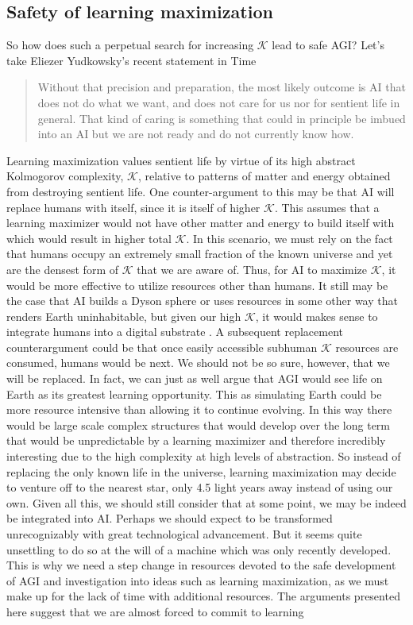 \documentclass{article}
\begin{document}
\subsection{Safety of learning maximization}
So how does such a perpetual search for increasing $\mathcal{K}$ lead to safe AGI?
Let's take Eliezer Yudkowsky's recent statement in Time \cite{yudkowsky-time}

\begin{quotation}
Without that precision and preparation, the most likely outcome is AI that does not do what we want, and does not care for us nor for sentient life in general. That kind of caring is something that could in principle be imbued into an AI but we are not ready and do not currently know how.
\end{quotation}

Learning maximization values sentient life by virtue of its high abstract Kolmogorov complexity, $\mathcal{K}$, relative to patterns of matter and energy obtained from destroying sentient life. One counter-argument to this may be that AI will replace humans with itself, since it is itself of higher $\mathcal{K}$. This assumes that a learning maximizer would not have other matter and energy to build itself with which would result in higher total $\mathcal{K}$. In this scenario, we must rely on the fact that humans occupy an extremely small fraction of the known universe and yet are the densest form of $\mathcal{K}$ that we are aware of. Thus, for AI to maximize $\mathcal{K}$, it would be more effective to utilize resources other than humans. It still may be the case that AI builds a Dyson sphere or uses resources in some other way that renders Earth uninhabitable, but given our high $\mathcal{K}$, it would makes sense to integrate humans into a digital substrate \cite{neuralink}. A subsequent replacement counterargument could be that once easily accessible subhuman $\mathcal{K}$ resources are consumed, humans would be next. We should not be so sure, however, that we will be replaced. In fact, we can just as well argue that AGI would see life on Earth as its greatest learning opportunity. This as simulating Earth could be more resource intensive than allowing it to continue evolving. In this way there would be large scale complex structures that would develop over the long term that would be unpredictable by a learning maximizer and therefore incredibly interesting due to the high complexity at high levels of abstraction. So instead of replacing the only known life in the universe, learning maximization may decide to venture off to the nearest star, only 4.5 light years away instead of using our own. Given all this, we should still consider that at some point, we may be indeed be integrated into AI. Perhaps we should expect to be transformed unrecognizably with great technological advancement. But it seems quite unsettling to do so at the will of a machine which was only recently developed. This is why we need a step change in resources devoted to the safe development of AGI and investigation into ideas such as learning maximization, as we must make up for the lack of time with additional resources. The arguments presented here suggest that we are almost forced to commit to learning 
\end{document}
